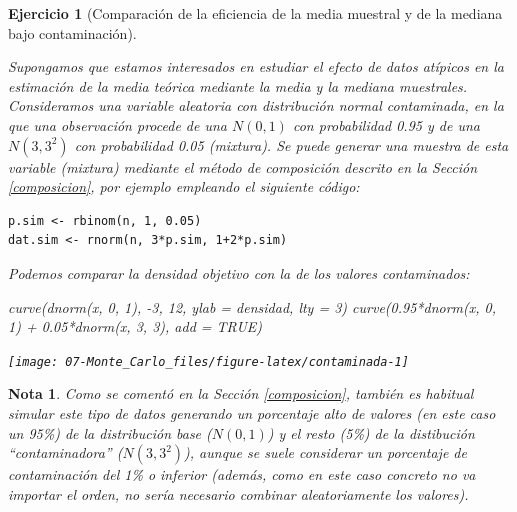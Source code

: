 \documentclass[
]{book}
\newenvironment{Shaded}{\begin{snugshade}}{\end{snugshade}}
\newcommand{\AttributeTok}[1]{\textcolor[rgb]{0.77,0.63,0.00}{#1}}
\newcommand{\ConstantTok}[1]{\textcolor[rgb]{0.00,0.00,0.00}{#1}}
\newcommand{\DecValTok}[1]{\textcolor[rgb]{0.00,0.00,0.81}{#1}}
\newcommand{\FloatTok}[1]{\textcolor[rgb]{0.00,0.00,0.81}{#1}}
\newcommand{\FunctionTok}[1]{\textcolor[rgb]{0.00,0.00,0.00}{#1}}
\newcommand{\NormalTok}[1]{#1}
\newcommand{\SpecialCharTok}[1]{\textcolor[rgb]{0.00,0.00,0.00}{#1}}
\newcommand{\StringTok}[1]{\textcolor[rgb]{0.31,0.60,0.02}{#1}}
\theoremstyle{break}
\newtheorem{exercise}{Ejercicio}[chapter]
\theoremstyle{nonumberplain}
\newtheorem{remark}{Nota}
\begin{document}
\begin{exercise}[Comparación de la eficiencia de la media muestral y de la mediana bajo contaminación]
\protect\hypertarget{exr:media-median}{}\label{exr:media-median}

Supongamos que estamos interesados en estudiar el efecto de datos atípicos en la estimación de la media teórica mediante la media y la mediana muestrales.
Consideramos una variable aleatoria con distribución normal contaminada, en la que una observación procede de una \(N(0,1)\) con probabilidad 0.95 y de una \(N(3,3^2)\) con probabilidad 0.05 (mixtura).
Se puede generar una muestra de esta variable (mixtura) mediante el método de composición descrito en la Sección \ref{composicion}, por ejemplo empleando el siguiente código:

\begin{verbatim}
p.sim <- rbinom(n, 1, 0.05)
dat.sim <- rnorm(n, 3*p.sim, 1+2*p.sim)
\end{verbatim}

Podemos comparar la densidad objetivo con la de los valores contaminados:

\begin{Shaded}
\begin{Highlighting}[]
\FunctionTok{curve}\NormalTok{(}\FunctionTok{dnorm}\NormalTok{(x, }\DecValTok{0}\NormalTok{, }\DecValTok{1}\NormalTok{), }\SpecialCharTok{{-}}\DecValTok{3}\NormalTok{, }\DecValTok{12}\NormalTok{, }\AttributeTok{ylab =} \StringTok{\textquotesingle{}densidad\textquotesingle{}}\NormalTok{, }\AttributeTok{lty =} \DecValTok{3}\NormalTok{)}
\FunctionTok{curve}\NormalTok{(}\FloatTok{0.95}\SpecialCharTok{*}\FunctionTok{dnorm}\NormalTok{(x, }\DecValTok{0}\NormalTok{, }\DecValTok{1}\NormalTok{) }\SpecialCharTok{+} \FloatTok{0.05}\SpecialCharTok{*}\FunctionTok{dnorm}\NormalTok{(x, }\DecValTok{3}\NormalTok{, }\DecValTok{3}\NormalTok{), }\AttributeTok{add =} \ConstantTok{TRUE}\NormalTok{)}
\end{Highlighting}
\end{Shaded}

\begin{center}\texttt{[image: 07-Monte\_Carlo\_files/figure-latex/contaminada-1]} \end{center}

\end{exercise}

\begin{remark}
Como se comentó en la Sección \ref{composicion}, también es habitual simular este tipo de datos generando un porcentaje alto de valores (en este caso un 95\%) de la distribución base (\(N(0,1)\)) y el resto (5\%) de la distibución ``contaminadora'' (\(N(3,3^2)\)), aunque se suele considerar un porcentaje de contaminación del 1\% o inferior (además, como en este caso concreto no va importar el orden, no sería necesario combinar aleatoriamente los valores).
\end{remark}
\end{document}
